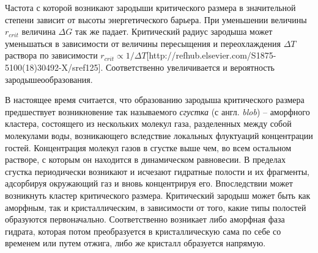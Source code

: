 Частота с которой возникают зародыши критического размера в значительной степени зависит от высоты энергетического барьера. При уменьшении величины $r_{crit}$ величина $\Delta G$ так же падает. Критический радиус зародыша может уменьшаться в зависимости от величины пересыщения и переохлаждения $\Delta T$ раствора по зависимости $r_{crit} \propto 1/\Delta T$[http://refhub.elsevier.com/S1875-5100(18)30492-X/sref125]. Соответственно увеличивается и вероятность зародышеообразования. 

В настоящее время считается, что образованию зародыша критического размера предшествует возникновение так называемого \textit{сгустка} (с англ. \textit{blob}) -- аморфного кластера, состоящего из нескольких молекул газа, разделенных между собой молекулами воды, возникающего вследствие локальных флуктуаций концентрации гостей. Концентрация молекул газов в сгустке выше чем, во всем остальном растворе, с которым он находится в динамическом равновесии. В пределах сгустка периодически возникают и исчезают гидратные полости и их фрагменты, адсорбируя окружающий газ и вновь концентрируя его. Впоследствии может возникнуть кластер критического размера. Критический зародыш может быть как аморфным, так и кристаллическим, в зависимости от того, какие типы полостей образуются первоначально. Соответственно возникает либо аморфная фаза гидрата, которая потом преобразуется в кристаллическую сама по себе со временем или путем отжига, либо же кристалл образуется напрямую.